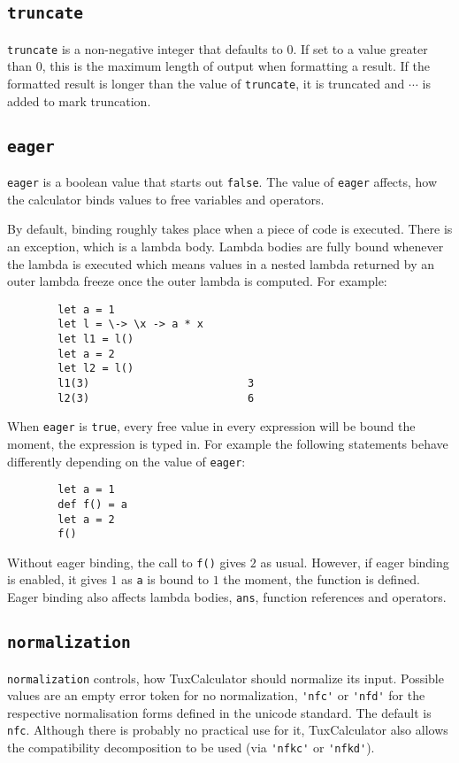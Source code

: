 \documentclass[10pt]{article}
\begin{document}
    \subsection{\texttt{truncate}}\label{subsec:truncate}
    \verb|truncate| is a non-negative integer that defaults to $ 0 $.
    If set to a value greater than $ 0 $, this is the maximum length of output when formatting a result.
    If the formatted result is longer than the value of \verb|truncate|, it is truncated and $ \cdots $ is added to mark truncation.
    
    \subsection{\texttt{eager}}\label{subsec:eager}
    \verb|eager| is a boolean value that starts out \verb|false|.
    The value of \verb|eager| affects, how the calculator binds values to free variables and operators.
    
    By default, binding roughly takes place when a piece of code is executed.
    There is an exception, which is a lambda body.
    Lambda bodies are fully bound whenever the lambda is executed which means values in a nested lambda returned by an outer lambda freeze once the outer lambda is computed.
    For example:
    \begin{verbatim}
        let a = 1
        let l = \-> \x -> a * x
        let l1 = l()
        let a = 2
        let l2 = l()
        l1(3)                         3
        l2(3)                         6
    \end{verbatim}
    When \verb|eager| is \verb|true|, every free value in every expression will be bound the moment, the expression is typed in.
    For example the following statements behave differently depending on the value of \verb|eager|:
    \begin{verbatim}
        let a = 1
        def f() = a
        let a = 2
        f()
    \end{verbatim}
    Without eager binding, the call to \verb|f()| gives $ 2 $ as usual.
    However, if eager binding is enabled, it gives $ 1 $ as \verb|a| is bound to $ 1 $ the moment, the function is defined.
    Eager binding also affects lambda bodies, \verb|ans|, function references and operators.
    
    \subsection{\texttt{normalization}}\label{subsec:normalization}
    \verb|normalization| controls, how TuxCalculator should normalize its input.
    Possible values are an empty error token for no normalization, \verb|'nfc'| or \verb|'nfd'| for the respective normalisation forms defined in the unicode standard.
    The default is \verb|nfc|.
    Although there is probably no practical use for it, TuxCalculator also allows the compatibility decomposition to be used (via \verb|'nfkc'| or \verb|'nfkd'|).
    
\end{document}

